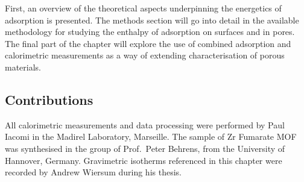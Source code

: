 First, an overview of the theoretical aspects underpinning
the energetics of adsorption is presented. The methods
section will go into detail in the available methodology
for studying the enthalpy of adsorption on surfaces and in
pores. The final part of the chapter will explore the use
of combined adsorption and calorimetric measurements
as a way of extending characterisation of porous materials.

\subsection*{Contributions}

All calorimetric measurements and data processing were
performed by Paul Iacomi in the Madirel Laboratory, Marseille.
The sample of Zr Fumarate MOF was synthesised in the group
of Prof.\ Peter Behrens, from the University of Hannover,
Germany. Gravimetric isotherms referenced in this chapter were
recorded by Andrew Wiersum during his thesis.